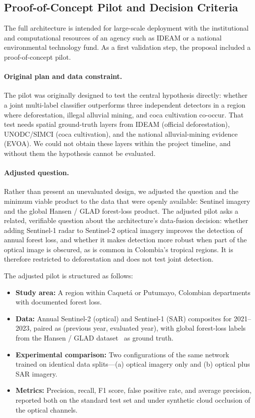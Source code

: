 \documentclass{article}
\begin{document}
\subsection{Proof-of-Concept Pilot and Decision Criteria}
\label{sec:pilot-criteria}

The full architecture is intended for large-scale deployment with the
institutional and computational resources of an agency such as IDEAM or a
national environmental technology fund.
As a first validation step, the proposal included a proof-of-concept pilot.

\paragraph{Original plan and data constraint.}
The pilot was originally designed to test the central hypothesis directly:
whether a joint multi-label classifier outperforms three independent detectors
in a region where deforestation, illegal alluvial mining, and coca cultivation
co-occur.
That test needs spatial ground-truth layers from IDEAM (official deforestation),
UNODC/SIMCI (coca cultivation), and the national alluvial-mining evidence
(EVOA).
We could not obtain these layers within the project timeline, and without them
the hypothesis cannot be evaluated.

\paragraph{Adjusted question.}
Rather than present an unevaluated design, we adjusted the question and the
minimum viable product to the data that were openly available: Sentinel imagery
and the global Hansen / GLAD forest-loss product.
The adjusted pilot asks a related, verifiable question about the architecture's
data-fusion decision: whether adding Sentinel-1 radar to Sentinel-2 optical
imagery improves the detection of annual forest loss, and whether it makes
detection more robust when part of the optical image is obscured, as is common
in Colombia's tropical regions.
It is therefore restricted to deforestation and does not test joint detection.

The adjusted pilot is structured as follows:
\begin{itemize}
    \item \textbf{Study area:} A region within Caquetá or Putumayo, Colombian
    departments with documented forest loss.
    \item \textbf{Data:} Annual Sentinel-2 (optical) and Sentinel-1 (SAR)
    composites for 2021--2023, paired as (previous year, evaluated year), with
    global forest-loss labels from the Hansen / GLAD dataset~\cite{hansen2013}
    as ground truth.
    \item \textbf{Experimental comparison:} Two configurations of the same
    network trained on identical data splits---(a) optical imagery only and
    (b) optical plus SAR imagery.
    \item \textbf{Metrics:} Precision, recall, F1 score, false positive rate,
    and average precision, reported both on the standard test set and under
    synthetic cloud occlusion of the optical channels.
\end{itemize}
\end{document}
